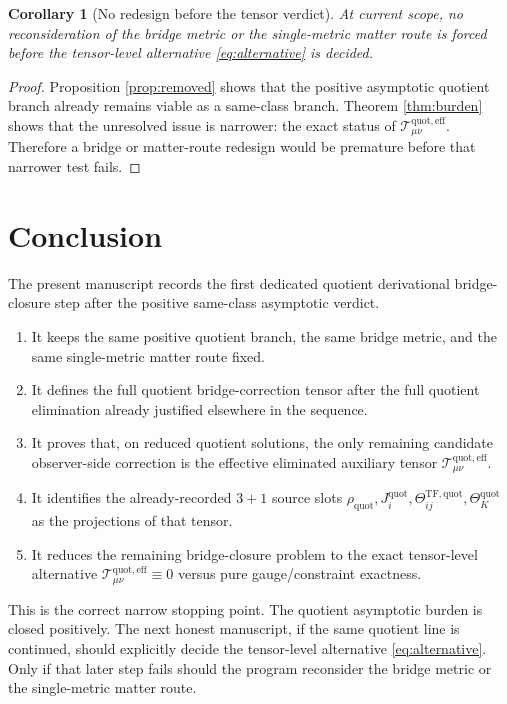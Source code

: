 \documentclass[11pt]{article}
\newcommand{\EffAux}{\mathcal T_{\mu\nu}^{\mathrm{quot,eff}}}
\newtheorem{corollary}{Corollary}
\begin{document}
\begin{corollary}[No redesign before the tensor verdict]
\label{cor:noredesign}
At current scope, no reconsideration of the bridge metric or the single-metric matter route is forced before the tensor-level alternative \eqref{eq:alternative} is decided.
\end{corollary}

\begin{proof}
Proposition \ref{prop:removed} shows that the positive asymptotic quotient branch already remains viable as a same-class branch. Theorem \ref{thm:burden} shows that the unresolved issue is narrower: the exact status of \(\EffAux\). Therefore a bridge or matter-route redesign would be premature before that narrower test fails.
\end{proof}

\section{Conclusion}

The present manuscript records the first dedicated quotient derivational bridge-closure step after the positive same-class asymptotic verdict.
\begin{enumerate}
    \item It keeps the same positive quotient branch, the same bridge metric, and the same single-metric matter route fixed.
    \item It defines the full quotient bridge-correction tensor after the full quotient elimination already justified elsewhere in the sequence.
    \item It proves that, on reduced quotient solutions, the only remaining candidate observer-side correction is the effective eliminated auxiliary tensor \(\EffAux\).
    \item It identifies the already-recorded \(3+1\) source slots \(\rho_{\mathrm{quot}},J_i^{\mathrm{quot}},\Theta_{ij}^{\mathrm{TF,quot}},\Theta_K^{\mathrm{quot}}\) as the projections of that tensor.
    \item It reduces the remaining bridge-closure problem to the exact tensor-level alternative \(\EffAux\equiv0\) versus pure gauge/constraint exactness.
\end{enumerate}

This is the correct narrow stopping point. The quotient asymptotic burden is closed positively. The next honest manuscript, if the same quotient line is continued, should explicitly decide the tensor-level alternative \eqref{eq:alternative}. Only if that later step fails should the program reconsider the bridge metric or the single-metric matter route.
\end{document}
